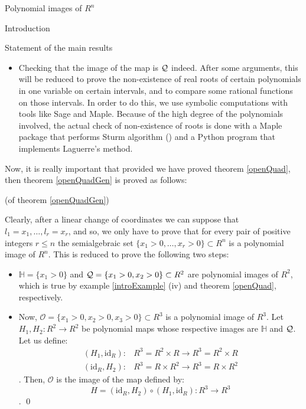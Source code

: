 \documentclass[11pt, a4paper, english, twoside, notitlepage]{report}
\begin{document}
\begin{chapter}{Polynomial images of $R^n$}
\begin{section}{Introduction}
\begin{subsection}{Statement of the main results}
\begin{itemize}
		\item Checking that the image of the map is $\mathcal{Q}$ indeed. After some arguments, this will be reduced to prove the non-existence of real roots of certain polynomials in one variable on certain intervals, and to compare some rational functions on those intervals. In order to do this, we use symbolic computations with tools like Sage and Maple. Because of the high degree of the polynomials involved, the actual check of non-existence of roots is done with a Maple package that performs Sturm algorithm (\cite[1.2.10]{bcr}) and a Python program that implements Laguerre's method.
				
	\end{itemize}

		Now, it is really important that provided we have proved theorem \ref{openQuad}, then theorem \ref{openQuadGen} is proved as follows:
		
		\begin{Proof}(of theorem \ref{openQuadGen})
			
			Clearly, after a linear change of coordinates we can suppose that $l_1=x_1,\dots,l_r=x_r$, and so, we only have to prove that for every pair of positive integers $r\leq n$ the semialgebraic set $\{x_1>0,\dots,x_r>0\}\subset R^n$ is a polynomial image of $ R^n$. This is reduced to prove the following two steps:
			
			\begin{itemize}
				
				\item $\mathbb{H}=\{x_1>0\}$ and $\mathcal{Q}=\{x_1>0,x_2>0\}\subset R^2$ are polynomial images of $R^2$, which is true by example \ref{introExample} (iv) and theorem \ref{openQuad}, respectively.
				
				\item Now, $\mathcal{O}=\{x_1>0,x_2>0,x_3>0\}\subset R^3$ is a polynomial image of $R^3$.  Let $H_1,H_2:R^2 \rightarrow R^2$ be polynomial maps whose respective images are $\mathbb{H}$ and $\mathcal{Q}$. Let us define:
				\begin{align*}
					(H_1,\text{id}_R):& R^3=R^2\times R\longrightarrow R^3= R^2\times R\\
					(\text{id}_R,H_2):& R^3=R\times R^2\longrightarrow R^3= R\times R^2
				\end{align*}
				. Then, $\mathcal{O}$ is the image of the map defined by:
				$$H=(\text{id}_R,H_2)\circ(H_1,\text{id}_R):R^3\rightarrow R^3$$. \qed
			\end{itemize} 
			

\end{Proof}
\end{subsection}
\end{section}
\end{chapter}
\end{document}
